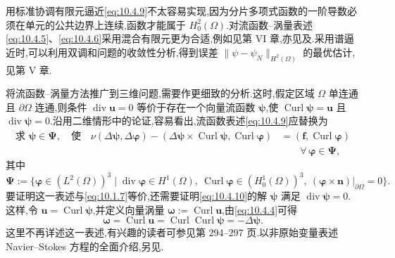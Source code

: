 用标准协调有限元逼近\eqref{eq:10.4.9}不太容易实现,因为分片多项式函数的一阶导数必须在单元的公共边界上连续,函数才能属于 \(H_0^2(\Omega)\).对流函数--涡量表述\eqref{eq:10.4.5}、\eqref{eq:10.4.6}采用混合有限元更为合适,例如见第 VI 章,亦见及.采用谱逼近时,可以利用双调和问题的收敛性分析,得到误差 \(\|\psi-\psi_N\|_{H^2(\Omega)}\) 的最优估计,见第 V 章.

将流函数--涡量方法推广到三维问题,需要作更细致的分析.这时,假定区域 \(\Omega\) 单连通且 \(\partial\Omega\) 连通,则条件 \(\operatorname{div}\boldsymbol{u}=0\) 等价于存在一个向量流函数 \(\boldsymbol{\psi}\),使 \(\operatorname{Curl}\boldsymbol{\psi}=\boldsymbol{u}\) 且 \(\operatorname{div}\boldsymbol{\psi}=0\).沿用二维情形中的论证,容易看出,流函数表述\eqref{eq:10.4.9}应替换为
\begin{equation}\label{eq:10.4.10}
  \begin{aligned}
    \text{求 }\boldsymbol{\psi}\in\boldsymbol{\Psi},\quad\text{使}\quad
    \nu(\Delta\boldsymbol{\psi},\Delta\boldsymbol{\varphi})
       -(\Delta\boldsymbol{\psi}\times\operatorname{Curl}\boldsymbol{\psi},
                \operatorname{Curl}\boldsymbol{\varphi})
       &=(\boldsymbol{f},\operatorname{Curl}\boldsymbol{\varphi})\\
       &\qquad\forall\,\boldsymbol{\varphi}\in\boldsymbol{\Psi},
  \end{aligned}
\end{equation}
其中
\[
  \boldsymbol{\Psi}:=\{\boldsymbol{\varphi}\in(L^2(\Omega))^3\mid
     \operatorname{div}\boldsymbol{\varphi}\in H^1(\Omega),\
     \operatorname{Curl}\boldsymbol{\varphi}\in(H_0^1(\Omega))^3,\
     (\boldsymbol{\varphi}\times\boldsymbol{n})|_{\partial\Omega}=0\}.
\]
要证明这一表述与\eqref{eq:10.1.7}等价,还需要证明\eqref{eq:10.4.10}的解 \(\boldsymbol{\psi}\) 满足 \(\operatorname{div}\boldsymbol{\psi}=0\).这样,令 \(\boldsymbol{u}=\operatorname{Curl}\boldsymbol{\psi}\),并定义向量涡量 \(\boldsymbol{\omega}:=\operatorname{Curl}\boldsymbol{u}\),由\eqref{eq:10.4.4}可得
\[
  \boldsymbol{\omega}=\operatorname{Curl}\boldsymbol{u}
       =\operatorname{Curl}\operatorname{Curl}\boldsymbol{\psi}
       =-\Delta\boldsymbol{\psi}.
\]
这里不再详述这一表述,有兴趣的读者可参见第 294–297 页.以非原始变量表述 Navier--Stokes 方程的全面介绍,另见.

